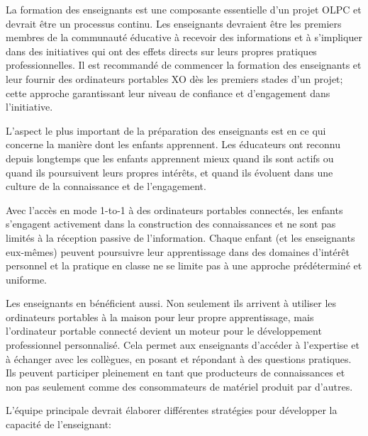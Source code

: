 \documentclass[11pt]{article}
\begin{document}
La formation des enseignants est une composante essentielle d'un projet
OLPC et devrait être un processus continu. Les enseignants devraient être
les premiers membres de la communauté éducative à recevoir des informations
et à s'impliquer dans des initiatives qui ont des effets directs sur leurs
propres pratiques professionnelles. Il est recommandé de commencer la
formation des enseignants et leur fournir des ordinateurs portables XO dès
les premiers stades d'un projet; cette approche garantissant leur niveau de
confiance et d'engagement dans l'initiative.

L'aspect le plus important de la préparation des enseignants est en ce qui
concerne la manière dont les enfants apprennent. Les éducateurs ont reconnu
depuis longtemps que les enfants apprennent mieux quand ils sont actifs ou
quand ils poursuivent leurs propres intérêts, et quand ils évoluent dans
une culture de la connaissance et de l'engagement.

Avec l'accès en mode 1-to-1 à des ordinateurs portables connectés, les
enfants s'engagent activement dans la construction des connaissances et ne
sont pas limités à la réception passive de l'information. Chaque enfant (et
les enseignants eux-mêmes) peuvent poursuivre leur apprentissage dans des
domaines d'intérêt personnel et la pratique en classe ne se limite pas à
une approche prédéterminé et uniforme.

Les enseignants en bénéficient aussi. Non seulement ils arrivent à utiliser
les ordinateurs portables à la maison pour leur propre apprentissage, mais
l'ordinateur portable connecté devient un moteur pour le développement
professionnel personnalisé. Cela permet aux enseignants d'accéder à
l'expertise et à échanger avec les collègues, en posant et répondant à des
questions pratiques. Ils peuvent participer pleinement en tant que
producteurs de connaissances et non pas seulement comme des consommateurs
de matériel produit par d'autres.

L'équipe principale devrait élaborer différentes stratégies pour développer
la capacité de l'enseignant:

\end{document}
